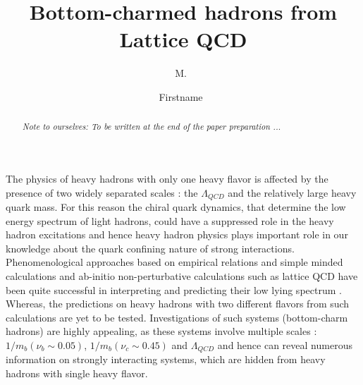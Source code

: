 \documentclass[showkeys,aps,10pt,twocolumn,showpacs,preprintnumbers,amsmath,amssymb,prd,letterpaper,floatfix,nofootinbib,superscriptaddress,]{revtex4-1}
\newcommand\self[1]{{\color{blue}\it Note to ourselves: #1}}
\begin{document}

\title{Bottom-charmed hadrons from Lattice QCD}

\author{M.\ }
\author{Firstname\ }


\begin{abstract}
\self{To be written at the end of the paper preparation ...}
\end{abstract}

\maketitle

The physics of heavy hadrons with only one heavy flavor is affected by the presence of two widely 
separated scales : the $\Lambda_{QCD}$ and the relatively large heavy quark mass. For this reason
the chiral quark dynamics, that determine the low energy spectrum of light hadrons, could have a 
suppressed role in the heavy hadron excitations and hence heavy hadron physics plays important role 
in our knowledge about the quark confining nature of strong interactions. Phenomenological approaches 
based on empirical relations and simple minded calculations and ab-initio non-perturbative calculations
such as lattice QCD have been quite successful in interpreting and predicting their low lying spectrum 
\cite{}. Whereas, the predictions on heavy hadrons with two different flavors from such calculations 
are yet to be tested. Investigations of such systems (bottom-charm hadrons) are highly appealing, as 
these systems involve multiple scales : $1/m_b(\nu_b\sim0.05)$, $1/m_b(\nu_c\sim0.45)$ and $\Lambda_{QCD}$ 
and hence can reveal numerous information on strongly interacting systems, which are hidden from 
heavy hadrons with single heavy flavor. 
\end{document}
